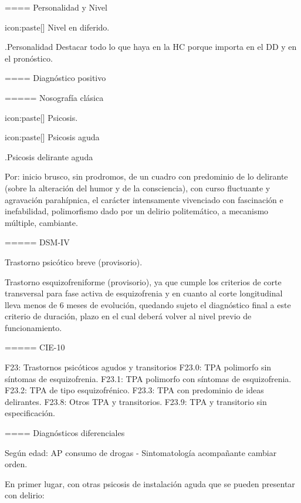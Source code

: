 ==== Personalidad y Nivel

icon:paste[] Nivel en diferido.

.Personalidad
Destacar todo lo que haya en la HC porque importa en el DD y en el pronóstico.

==== Diagnóstico positivo

===== Nosografía clásica

icon:paste[] Psicosis.

icon:paste[] Psicosis aguda

.Psicosis delirante aguda

Por: inicio brusco, sin prodromos, de un cuadro con predominio de lo delirante (sobre la alteración del humor y de la consciencia), con curso fluctuante y agravación parahípnica, el carácter intensamente vivenciado con fascinación e inefabilidad, polimorfismo dado por un delirio politemático, a mecanismo múltiple, cambiante.

===== DSM-IV

Trastorno psicótico breve (provisorio).

Trastorno esquizofreniforme (provisorio), ya que cumple los criterios de corte transversal para fase activa de esquizofrenia y en cuanto al corte longitudinal lleva menos de 6 meses de evolución, quedando sujeto el diagnóstico final a este criterio de duración, plazo en el cual deberá volver al nivel previo de funcionamiento.

===== CIE-10

F23: Trastornos psicóticos agudos y transitorios
F23.0: TPA polimorfo sin síntomas de esquizofrenia.
F23.1: TPA polimorfo con síntomas de esquizofrenia.
F23.2: TPA de tipo esquizofrénico.
F23.3: TPA con predominio de ideas delirantes.
F23.8: Otros TPA y transitorios.
F23.9: TPA y transitorio sin especificación.

==== Diagnósticos diferenciales

Según edad: AP consumo de drogas - Sintomatología acompañante cambiar orden.

En primer lugar, con otras psicosis de instalación aguda que se pueden presentar con delirio:

